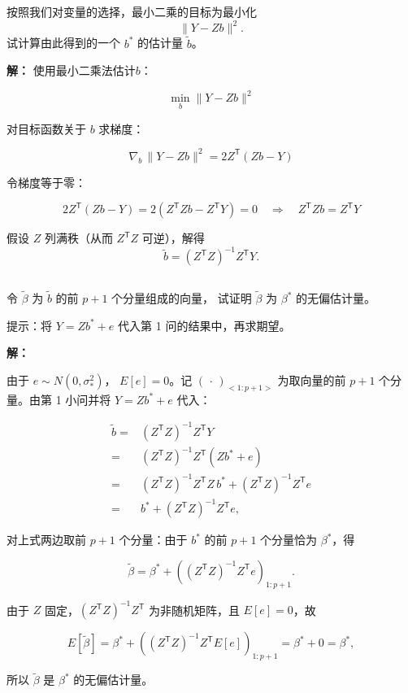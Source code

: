 \documentclass[12pt,a4paper]{article}
\begin{document}
\subsection{}

按照我们对变量的选择，最小二乘的目标为最小化
    \[
      \lVert Y-Zb\rVert^2.
    \]
试计算由此得到的一个 $b^*$ 的估计量 $\widetilde{b}$。

\begin{answerbox}
\textbf{解：}
使用最小二乘法估计$b$：

$$
\min_{b} \lVert Y-Zb\rVert^2
$$

对目标函数关于 $b$ 求梯度：

$$
\nabla_b\,\lVert Y-Zb\rVert^2=2Z^{\mathsf T}(Zb-Y)
$$

令梯度等于零：

$$
2Z^{\mathsf T}(Zb-Y)=2(Z^{\mathsf T}Zb-Z^{\mathsf T}Y)=0
\quad\Longrightarrow\quad
Z^{\mathsf T}Zb=Z^{\mathsf T}Y
$$

假设 $Z$ 列满秩（从而 $Z^{\mathsf T}Z$ 可逆），解得
$$
\widetilde{b}=(Z^{\mathsf T}Z)^{-1}Z^{\mathsf T}Y.
$$

\end{answerbox}

\subsection{}

令 $\widetilde{\beta}$ 为 $\widetilde{b}$ 的前 $p+1$ 个分量组成的向量，
    试证明 $\widetilde{\beta}$ 为 $\beta^*$ 的无偏估计量。

    提示：将 $Y=Zb^*+e$ 代入第 1 问的结果中，再求期望。

\begin{answerbox}
\textbf{解：}

由于 $e\sim N(0, \sigma_*^2)$， $E[e]=0$。记 $(\,\cdot\,)_{<1:p+1>}$ 为取向量的前 $p+1$ 个分量。由第 1 小问并将 $Y=Zb^*+e$ 代入：

$$
\begin{aligned}
\widetilde{b}
=&(Z^{\mathsf T}Z)^{-1}Z^{\mathsf T}Y\\
=&(Z^{\mathsf T}Z)^{-1}Z^{\mathsf T}(Zb^*+e)\\
=&(Z^{\mathsf T}Z)^{-1}Z^{\mathsf T}Z\,b^*+(Z^{\mathsf T}Z)^{-1}Z^{\mathsf T}e\\
=&b^*+(Z^{\mathsf T}Z)^{-1}Z^{\mathsf T}e,
\end{aligned}
$$

对上式两边取前 $p+1$ 个分量：由于 $b^*$ 的前 $p+1$ 个分量恰为 $\beta^*$，得

$$
\widetilde{\beta}
=\beta^*+\left((Z^{\mathsf T}Z)^{-1}Z^{\mathsf T}e\right)_{1:p+1}.
$$

由于 $Z$ 固定，$(Z^{\mathsf T}Z)^{-1}Z^{\mathsf T}$ 为非随机矩阵，且 $E[e]=0$，故

$$
E\left[\widetilde{\beta}\right]
=\beta^*+\left((Z^{\mathsf T}Z)^{-1}Z^{\mathsf T}E[e]\right)_{1:p+1}
=\beta^*+0
=\beta^*,
$$

所以 $\widetilde{\beta}$ 是 $\beta^*$ 的无偏估计量。

\end{answerbox}
\end{document}
